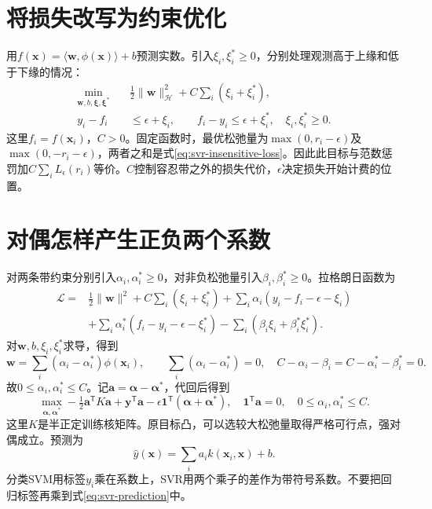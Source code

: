\section{将损失改写为约束优化}
用$f(\bm x)=\langle\bm w,\phi(\bm x)\rangle+b$预测实数。引入$\xi_i,\xi_i^*\ge0$，分别处理观测高于上缘和低于下缘的情况：
\begin{align}
 \min_{\bm w,b,\bm\xi,\bm\xi^*}\quad
 &\tfrac12\|\bm w\|_{\mathcal H}^2+C\sum_i(\xi_i+\xi_i^*),\label{eq:svr-primal}\\
 y_i-f_i&\le\epsilon+\xi_i,\qquad
 f_i-y_i\le\epsilon+\xi_i^*,\quad \xi_i,\xi_i^*\ge0.\nonumber
\end{align}
这里$f_i=f(\bm x_i)$，$C>0$。固定函数时，最优松弛量为$\max(0,r_i-\epsilon)$及$\max(0,-r_i-\epsilon)$，两者之和是式\eqref{eq:svr-insensitive-loss}。因此此目标与范数惩罚加$C\sum_iL_\epsilon(r_i)$等价。$C$控制容忍带之外的损失代价，$\epsilon$决定损失开始计费的位置。

\section{对偶怎样产生正负两个系数}
对两条带约束分别引入$\alpha_i,\alpha_i^*\ge0$，对非负松弛量引入$\beta_i,\beta_i^*\ge0$。拉格朗日函数为
\begin{align}
 \mathcal L={}&\tfrac12\|\bm w\|^2+C\sum_i(\xi_i+\xi_i^*)
 +\sum_i\alpha_i(y_i-f_i-\epsilon-\xi_i)\nonumber\\
 &+\sum_i\alpha_i^*(f_i-y_i-\epsilon-\xi_i^*)
 -\sum_i(\beta_i\xi_i+\beta_i^*\xi_i^*).
\end{align}
对$\bm w,b,\xi_i,\xi_i^*$求导，得到
\begin{equation}
 \bm w=\sum_i(\alpha_i-\alpha_i^*)\phi(\bm x_i),\qquad
 \sum_i(\alpha_i-\alpha_i^*)=0,
 \quad C-\alpha_i-\beta_i=C-\alpha_i^*-\beta_i^*=0.
\end{equation}
故$0\le\alpha_i,\alpha_i^*\le C$。记$\bm a=\bm\alpha-\bm\alpha^*$，代回后得到
\begin{equation}
 \max_{\bm\alpha,\bm\alpha^*}
 -\tfrac12\bm a^{\mathsf T}K\bm a+\bm y^{\mathsf T}\bm a
 -\epsilon\bm1^{\mathsf T}(\bm\alpha+\bm\alpha^*),
 \quad\bm1^{\mathsf T}\bm a=0,
 \quad0\le\alpha_i,\alpha_i^*\le C.
 \label{eq:svr-dual}
\end{equation}
这里$K$是半正定训练核矩阵。原目标凸，可以选较大松弛量取得严格可行点，强对偶成立。预测为
\begin{equation}
 \hat y(\bm x)=\sum_i a_i k(\bm x_i,\bm x)+b.
 \label{eq:svr-prediction}
\end{equation}
分类SVM用标签$y_i$乘在系数上，SVR用两个乘子的差作为带符号系数。不要把回归标签再乘到式\eqref{eq:svr-prediction}中。

